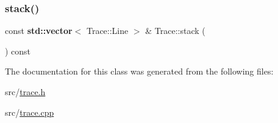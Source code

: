 \mbox{\label{class_trace_af87e0b98ad06d327c7a11c90dc8c8958}} 
\subsubsection{\texorpdfstring{stack()}{stack()}}
{\footnotesize\ttfamily const \textbf{ std\+::vector}$<$ Trace\+::\+Line $>$ \& Trace\+::stack (\begin{DoxyParamCaption}{ }\end{DoxyParamCaption}) const}



The documentation for this class was generated from the following files\+:\begin{DoxyCompactItemize}
\item 
src/\hyperlink{trace_8h}{trace.\+h}\item 
src/\hyperlink{trace_8cpp}{trace.\+cpp}\end{DoxyCompactItemize}
